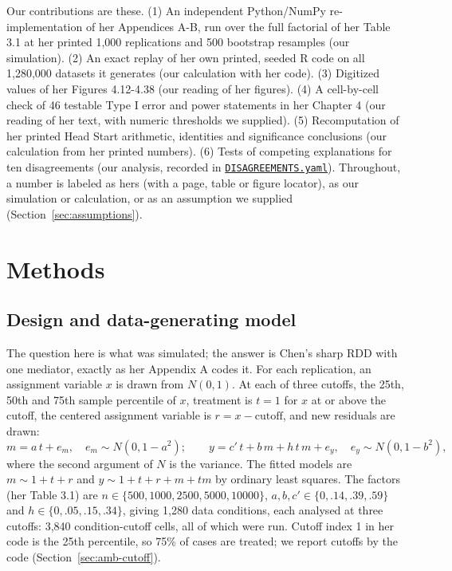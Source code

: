 Our contributions are these. (1) An independent Python/NumPy re-implementation of her Appendices A-B, run over the full factorial of her Table 3.1 at her printed 1,000 replications and 500 bootstrap resamples (our simulation). (2) An exact replay of her own printed, seeded R code on all 1,280,000 datasets it generates (our calculation with her code). (3) Digitized values of her Figures 4.12-4.38 (our reading of her figures). (4) A cell-by-cell check of 46 testable Type I error and power statements in her Chapter 4 (our reading of her text, with numeric thresholds we supplied). (5) Recomputation of her printed Head Start arithmetic, identities and significance conclusions (our calculation from her printed numbers). (6) Tests of competing explanations for ten disagreements (our analysis, recorded in \href{https://github.com/alectionary/vibe-math/blob/master/formalization/chen-rdd-mediation/DISAGREEMENTS.yaml}{\nolinkurl{DISAGREEMENTS.yaml}}). Throughout, a number is labeled as hers (with a page, table or figure locator), as our simulation or calculation, or as an assumption we supplied (Section~\ref{sec:assumptions}).

\section{Methods}\label{sec:methods}

\subsection{Design and data-generating model}\label{sec:design}

The question here is what was simulated; the answer is Chen's sharp RDD with one mediator, exactly as her Appendix A codes it. For each replication, an assignment variable $x$ is drawn from $N(0,1)$. At each of three cutoffs, the 25th, 50th and 75th sample percentile of $x$, treatment is $t = 1$ for $x$ at or above the cutoff, the centered assignment variable is $r = x - \text{cutoff}$, and new residuals are drawn:
\[ m = a\,t + e_m,\quad e_m \sim N(0, 1-a^2); \qquad y = c'\,t + b\,m + h\,t\,m + e_y,\quad e_y \sim N(0, 1-b^2), \]
where the second argument of $N$ is the variance. The fitted models are $m \sim 1 + t + r$ and $y \sim 1 + t + r + m + tm$ by ordinary least squares. The factors (her Table 3.1) are $n \in \{500, 1000, 2500, 5000, 10000\}$, $a, b, c' \in \{0, .14, .39, .59\}$ and $h \in \{0, .05, .15, .34\}$, giving 1,280 data conditions, each analysed at three cutoffs: 3,840 condition-cutoff cells, all of which were run. Cutoff index 1 in her code is the 25th percentile, so 75\% of cases are treated; we report cutoffs by the code (Section~\ref{sec:amb-cutoff}).

